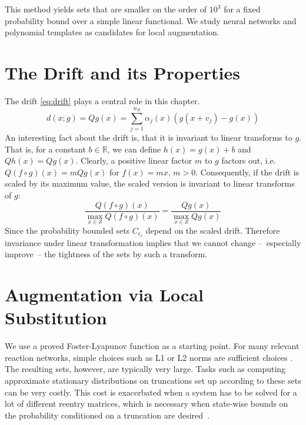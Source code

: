 This method yields sets that are smaller on the order of $10^3$ for a fixed probability bound over a simple linear functional.
We study neural networks and polynomial templates as candidates for local augmentation.

\section{The Drift and its Properties}
The drift \eqref{eq:drift} plays a central role in this chapter.
\begin{equation}
	d(x; g) = Qg(x) = \sum_{j=1}^{n_R} \alpha_j(x) (g(x+v_j) -  g(x))
\end{equation}
An interesting fact about the drift is, that it is invariant to linear transforms to $g$.
That is, for a constant $b\in\mathbb{R}$, we can define $h(x)=g(x)+b$ and \( Qh(x) =Qg(x)\).
Clearly, a positive linear factor $m$ to $g$ factors out, i.e.\ $Q(f\circ g)(x)=mQg(x)$ for $f(x) = mx$, $m>0$.
Consequently, if the drift is scaled by its maximum value, the scaled version is invariant to linear
transforms of $g$:
\begin{equation}
	\frac{Q(f\circ g)(x)}{\max_{x\in\mathcal{S}}Q(f \circ g)(x)}
	=
	\frac{Qg(x)}{\max_{x\in\mathcal{S}}Qg(x)}
\end{equation}
Since the probability bounded sets $C_{\epsilon_{\ell}}$ depend on the scaled drift.
Therefore invariance under linear transformation implies that we cannot change --~especially improve~-- the tightness of the sets by such a transform.

\section{Augmentation via Local Substitution}
We use a proved Foster-Lyapunov function as a starting point.
For many relevant reaction networks, simple choices such as L1 or L2 norms are sufficient choices \parencite{spieler2014numerical}.
The resulting sets, however, are typically very large.
Tasks such as computing approximate stationary distributions on truncations set up according to these sets can be very costly.
This cost is exacerbated when a system has to be solved for a lot of different reentry matrices, which is necessary when state-wise bounds on the probability conditioned on a truncation are desired~\parencite{dayar2011bounding}.

